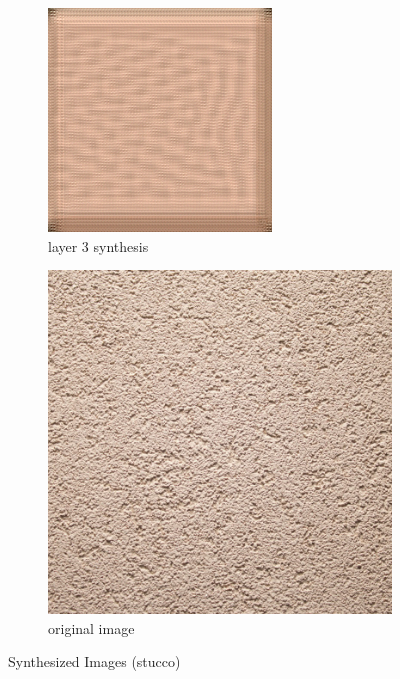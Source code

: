 \documentclass[11pt, oneside]{article}   	%
\begin{document}
\begin{figure}[H]
    \begin{subfigure}[b]{0.45\textwidth}
        \includegraphics[width=\textwidth]{figure/stucco/layer_03_001}
        \caption{layer 3 synthesis}
    \end{subfigure}
        \begin{subfigure}[b]{0.45\textwidth}
        \includegraphics[width=\textwidth]{figure/stucco/layer_00_001}
        \caption{original image}
    \end{subfigure}
    \caption{Synthesized Images (stucco)}\label{fig:stuccos}
\end{figure}
\end{document}
